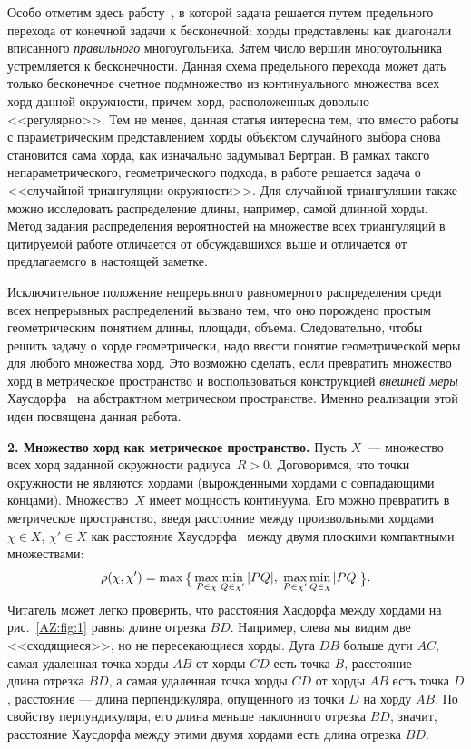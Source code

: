 \documentclass[12pt]{article}
\begin{document}
Особо отметим здесь работу~\cite{Gantsevich}, в которой задача решается путем
предельного перехода от конечной задачи к бесконечной: хорды представлены как
диагонали вписанного \emph{правильного} многоугольника. Затем число вершин
многоугольника устремляется к бесконечности. Данная схема предельного перехода
может дать только бесконечное счетное подмножество из континуального множества
всех хорд данной окружности, причем хорд, расположенных довольно
<<регулярно>>. Тем не менее, данная статья интересна тем, что вместо работы с
параметрическим представлением хорды объектом случайного выбора снова становится
сама хорда, как изначально задумывал Бертран. В рамках такого
непараметрического, геометрического подхода, в работе \cite{Aldou} решается
задача о <<случайной триангуляции окружности>>. Для случайной триангуляции также
можно исследовать распределение длины, например, самой длинной хорды. Метод
задания распределения вероятностей на множестве всех триангуляций в цитируемой
работе отличается от обсуждавшихся выше и отличается от предлагаемого в
настоящей заметке.

Исключительное положение непрерывного равномерного распределения среди всех
непрерывных распределений вызвано тем, что оно порождено простым геометрическим
понятием длины, площади, объема.  Следовательно, чтобы решить задачу о хорде
геометрически, надо ввести понятие геометрической меры для любого множества
хорд. Это возможно сделать, если превратить множество хорд в метрическое
пространство и воспользоваться конструкцией \emph{внешней меры}
Хаусдорфа~\cite{Edgar} на абстрактном метрическом пространстве. Именно
реализации этой идеи посвящена данная работа.\sloppy

\bigskip

\textbf{2. Множество хорд как метрическое пространство.}
Пусть $X$~--- множество всех хорд заданной окружности
радиуса~$R>0$. Договоримся, что точки окружности не являются хордами
(вырожденными хордами с совпадающими концами).  Множество~$X$ имеет мощность
континуума. Его можно превратить в метрическое пространство, введя расстояние
между произвольными хордами $\chi\in X$, $\chi'\in X$ как расстояние Хаусдорфа~\cite{Hausdorf} между двумя
плоскими компактными множествами:
\[
  \rho(\chi, \chi') = \max\raisebox{-0.25ex}{$\mathsurround=0pt \bigl\{$}
  \max_{P\in \chi} \min_{Q\in\chi'}|PQ|,\;
  \max_{P\in \chi'} \min_{Q\in\chi}|PQ|
  \raisebox{-0.25ex}{$\mathsurround=0pt \bigr\}$}.
\]
Читатель может легко проверить, что расстояния Хасдорфа между хордами на 
рис.~\ref{AZ:fig:1} равны длине отрезка $BD$. Например, слева мы видим две
<<сходящиеся>>, но не пересекающиеся хорды. Дуга $DB$ больше дуги $AC$, самая
удаленная точка хорды $AB$ от хорды $CD$ есть точка $B$, расстояние --- длина
отрезка $BD$, а самая удаленная точка хорды $CD$ от хорды $AB$ есть точка $D$,
расстояние --- длина перпендикуляра, опущенного из точки $D$ на хорду $AB$. По
свойству перпундикуляра, его длина меньше наклонного отрезка $BD$, значит,
расстояние Хаусдорфа между этими двумя хордами есть длина отрезка $BD$.
\end{document}
